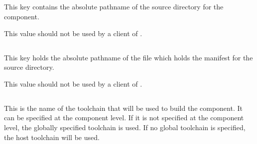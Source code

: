 
\subsection{}\label{variables:source-directory}

This key contains the absolute pathname of the source directory for
the component.

This value should not be used by a client of \lmsbw.


\subsection{}\label{variables:source-mtree-manifest}

This key holds the absolute pathname of the file which holds the
\mtree manifest for the source directory.

This value should not be used by a client of \lmsbw.


\subsection{}\label{variables:toolchain}

This is the name of the toolchain that will be used to build the
component.  It can be specified at the component level.  If it is not
specified at the component level, the globally specified toolchain is
used.  If no global toolchain is specified, the host toolchain will be
used.

